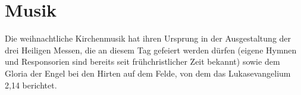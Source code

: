 \section{Musik}

Die weihnachtliche Kirchenmusik hat ihren Ursprung in der Ausgestaltung der drei Heiligen Messen, die an diesem Tag gefeiert werden dürfen (eigene Hymnen und Responsorien sind bereits seit frühchristlicher Zeit bekannt) sowie dem Gloria der Engel bei den Hirten auf dem Felde, von dem das Lukasevangelium 2,14 berichtet.
